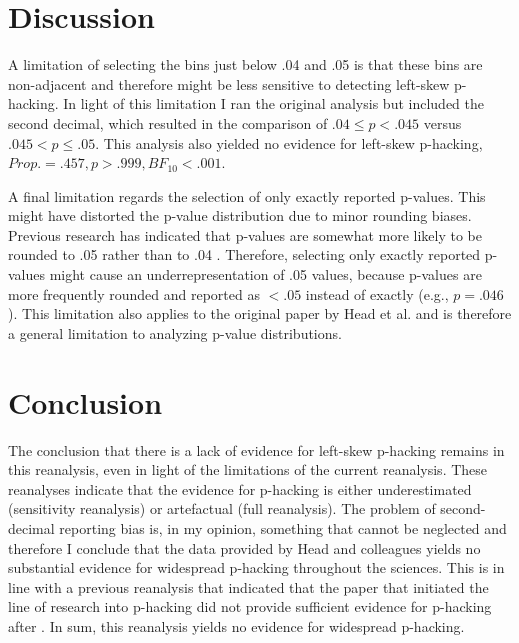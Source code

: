 \section*{Discussion} 
A limitation of selecting the bins just below .04 and .05 is that these bins are non-adjacent and therefore might be less sensitive to detecting left-skew p-hacking. In light of this limitation I ran the original analysis but included the second decimal, which resulted in the comparison of $.04\leq p<.045$ versus $.045<p\leq.05$. This analysis also yielded no evidence for left-skew p-hacking, $Prop.=.457,p>.999,BF_{10}<.001$. 

A final limitation regards the selection of only exactly reported p-values. This might have distorted the p-value distribution due to minor rounding biases. Previous research has indicated that p-values are somewhat more likely to be rounded to .05 rather than to .04 \cite{Krawczyk2015-uh}. Therefore, selecting only exactly reported p-values might cause an underrepresentation of .05 values, because p-values are more frequently rounded and reported as $<.05$ instead of exactly (e.g., $p=.046$). This limitation also applies to the original paper by Head et al. and is therefore a general limitation to analyzing p-value distributions.



\section*{Conclusion}
The conclusion that there is a lack of evidence for left-skew p-hacking remains in this reanalysis, even in light of the limitations of the current reanalysis. 
These reanalyses indicate that the evidence for p-hacking is either underestimated (sensitivity reanalysis) or artefactual  (full reanalysis). The problem of second-decimal reporting bias is, in my opinion, something that cannot be neglected and therefore I conclude that the data provided by Head and colleagues yields no substantial evidence for widespread p-hacking throughout the sciences. This is in line with a previous reanalysis that indicated that the paper that initiated the line of research into p-hacking \cite{Masicampo2012} did not provide sufficient evidence for p-hacking after \cite{Lakens2014}. In sum, this reanalysis yields no evidence for widespread p-hacking.
  
  